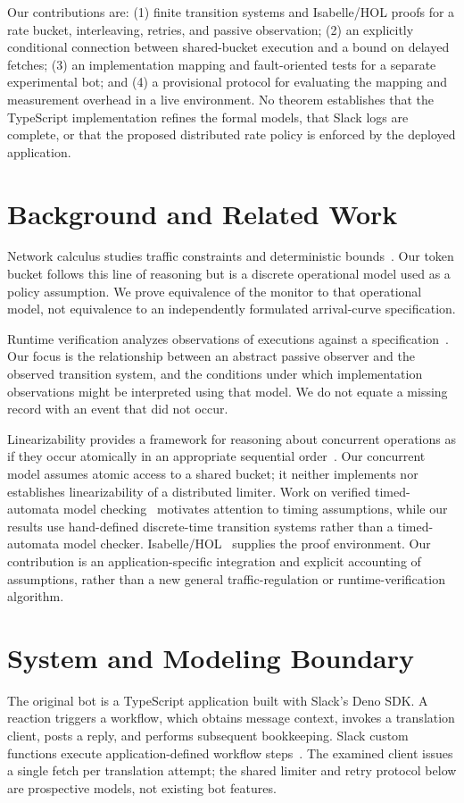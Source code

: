 \documentclass[10pt,twocolumn]{article}
\begin{document}
Our contributions are: (1) finite transition systems and Isabelle/HOL proofs for a rate bucket, interleaving, retries, and passive observation; (2) an explicitly conditional connection between shared-bucket execution and a bound on delayed fetches; (3) an implementation mapping and fault-oriented tests for a separate experimental bot; and (4) a provisional protocol for evaluating the mapping and measurement overhead in a live environment. No theorem establishes that the TypeScript implementation refines the formal models, that Slack logs are complete, or that the proposed distributed rate policy is enforced by the deployed application.

\section{Background and Related Work}
Network calculus studies traffic constraints and deterministic bounds~\cite{network,regulators}. Our token bucket follows this line of reasoning but is a discrete operational model used as a policy assumption. We prove equivalence of the monitor to that operational model, not equivalence to an independently formulated arrival-curve specification.

Runtime verification analyzes observations of executions against a specification~\cite{runtime}. Our focus is the relationship between an abstract passive observer and the observed transition system, and the conditions under which implementation observations might be interpreted using that model. We do not equate a missing record with an event that did not occur.

Linearizability provides a framework for reasoning about concurrent operations as if they occur atomically in an appropriate sequential order~\cite{linear}. Our concurrent model assumes atomic access to a shared bucket; it neither implements nor establishes linearizability of a distributed limiter. Work on verified timed-automata model checking~\cite{timed} motivates attention to timing assumptions, while our results use hand-defined discrete-time transition systems rather than a timed-automata model checker. Isabelle/HOL~\cite{isabelle} supplies the proof environment. Our contribution is an application-specific integration and explicit accounting of assumptions, rather than a new general traffic-regulation or runtime-verification algorithm.

\section{System and Modeling Boundary}
The original bot is a TypeScript application built with Slack's Deno SDK. A reaction triggers a workflow, which obtains message context, invokes a translation client, posts a reply, and performs subsequent bookkeeping. Slack custom functions execute application-defined workflow steps~\cite{slackfunctions}. The examined client issues a single fetch per translation attempt; the shared limiter and retry protocol below are prospective models, not existing bot features.
\end{document}
